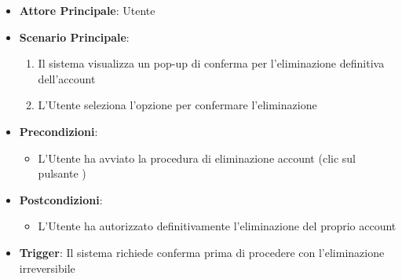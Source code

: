 \begin{itemize}
    \item \textbf{Attore Principale}: Utente
	\item \textbf{Scenario Principale}:
	\begin{enumerate}
		\item Il sistema visualizza un pop-up di conferma per l'eliminazione definitiva dell'account
		\item L'Utente seleziona l'opzione per confermare l'eliminazione
	\end{enumerate}
	\item \textbf{Precondizioni}:
	\begin{itemize}
		\item L'Utente ha avviato la procedura di eliminazione account (clic sul pulsante )
	\end{itemize}
	\item \textbf{Postcondizioni}:
	\begin{itemize}
		\item L'Utente ha autorizzato definitivamente l'eliminazione del proprio account
	\end{itemize}
	\item \textbf{Trigger}: Il sistema richiede conferma prima di procedere con l'eliminazione irreversibile
\end{itemize}